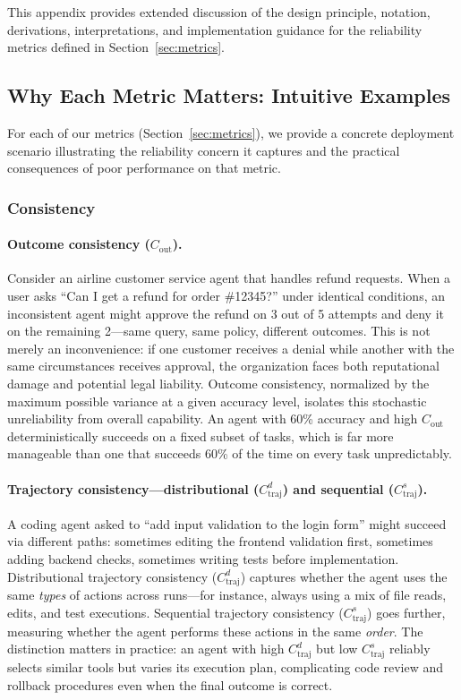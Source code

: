 \documentclass[11pt]{article}
\begin{document}
This appendix provides extended discussion of the design principle, notation, derivations, interpretations, and implementation guidance for the reliability metrics defined in Section~\ref{sec:metrics}.

\subsection{Why Each Metric Matters: Intuitive Examples}
\label{appendix:examples}

For each of our metrics (Section~\ref{sec:metrics}), we provide a concrete deployment scenario illustrating the reliability concern it captures and the practical consequences of poor performance on that metric.

\subsubsection{Consistency}

\paragraph{Outcome consistency ($C_{\text{out}}$).}
Consider an airline customer service agent that handles refund requests.
When a user asks ``Can I get a refund for order \#12345?'' under identical conditions, an inconsistent agent might approve the refund on 3 out of 5 attempts and deny it on the remaining 2---same query, same policy, different outcomes.
This is not merely an inconvenience: if one customer receives a denial while another with the same circumstances receives approval, the organization faces both reputational damage and potential legal liability.
Outcome consistency, normalized by the maximum possible variance at a given accuracy level, isolates this stochastic unreliability from overall capability.
An agent with 60\% accuracy and high $C_{\text{out}}$ deterministically succeeds on a fixed subset of tasks, which is far more manageable than one that succeeds 60\% of the time on every task unpredictably.

\paragraph{Trajectory consistency---distributional ($C_{\text{traj}}^d$) and sequential ($C_{\text{traj}}^s$).}
A coding agent asked to ``add input validation to the login form'' might succeed via different paths: sometimes editing the frontend validation first, sometimes adding backend checks, sometimes writing tests before implementation.
Distributional trajectory consistency ($C_{\text{traj}}^d$) captures whether the agent uses the same \emph{types} of actions across runs---for instance, always using a mix of file reads, edits, and test executions.
Sequential trajectory consistency ($C_{\text{traj}}^s$) goes further, measuring whether the agent performs these actions in the same \emph{order}.
The distinction matters in practice: an agent with high $C_{\text{traj}}^d$ but low $C_{\text{traj}}^s$ reliably selects similar tools but varies its execution plan, complicating code review and rollback procedures even when the final outcome is correct.
\end{document}
